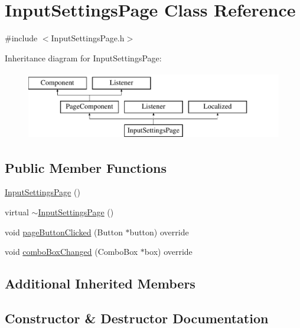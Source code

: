 \hypertarget{classInputSettingsPage}{}\section{Input\+Settings\+Page Class Reference}
\label{classInputSettingsPage}


{\ttfamily \#include $<$Input\+Settings\+Page.\+h$>$}

Inheritance diagram for Input\+Settings\+Page\+:\begin{figure}[H]
\begin{center}
\leavevmode
\includegraphics[height=3.000000cm]{classInputSettingsPage}
\end{center}
\end{figure}
\subsection*{Public Member Functions}
\begin{DoxyCompactItemize}
\item 
\mbox{\hyperlink{classInputSettingsPage_a9b357a8fc9bb067455fc89a698bdae46}{Input\+Settings\+Page}} ()
\item 
virtual \mbox{\hyperlink{classInputSettingsPage_a39fea05180c5232302d17fdd756fada4}{$\sim$\+Input\+Settings\+Page}} ()
\item 
void \mbox{\hyperlink{classInputSettingsPage_a89fcfdf1adb1d8a7a1ba03a2325d72f2}{page\+Button\+Clicked}} (Button $\ast$button) override
\item 
void \mbox{\hyperlink{classInputSettingsPage_a38660bfa140d4e6376fd2f9c35606115}{combo\+Box\+Changed}} (Combo\+Box $\ast$box) override
\end{DoxyCompactItemize}
\subsection*{Additional Inherited Members}


\subsection{Constructor \& Destructor Documentation}
\mbox{\label{classInputSettingsPage_a9b357a8fc9bb067455fc89a698bdae46}} 
